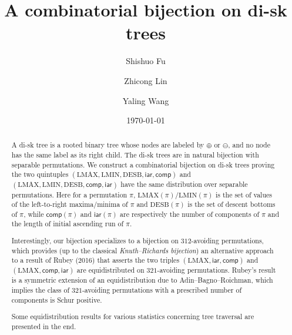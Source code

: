 \documentclass[12pt]{amsart}
\numberwithin{equation}{section}
\theoremstyle{plain}
\theoremstyle{definition}
\def\iar{\mathsf{iar}}
\def\comp{\mathsf{comp}}
\def\LMAX{\mathrm{LMAX}}
\def\LMIN{\mathrm{LMIN}}
\def\LMIN{\mathrm{LMIN}}
\def\DESB{\mathrm{DESB}}
\def\DESB{\mathrm{DESB}}
\begin{document}
\title[A combinatorial bijection on di-sk trees]{A combinatorial bijection on di-sk trees}


\author[S. Fu]{Shishuo Fu}
\address[Shishuo Fu]{College of Mathematics and Statistics, Chongqing University, Huxi campus, Chongqing 401331, P.R. China}

\author[Z. Lin]{Zhicong Lin}
\address[Zhicong Lin]{Research Center for Mathematics and Interdisciplinary Sciences, Shandong University, Qingdao 266237, P.R. China}

\author[Y. Wang]{Yaling Wang}
\address[Yaling Wang]{School of Mathematical Sciences, Dalian University of Technology, Dalian 116024, P.R. China}

\date{\today}


\begin{abstract}
A di-sk tree is a rooted binary tree whose nodes are labeled by $\oplus$ or $\ominus$, and no node has the same label as its right child. The di-sk trees are in natural bijection with separable permutations. We construct a combinatorial bijection on di-sk trees proving  the two quintuples $(\LMAX,\LMIN,\DESB,\iar,\comp)$ and $(\LMAX,\LMIN,\DESB,\comp,\iar)$ have the same distribution over separable permutations. Here for a permutation $\pi$, $\LMAX(\pi)/\LMIN(\pi)$ is the set of values of the left-to-right maxima/minima of $\pi$ and $\DESB(\pi)$ is the set of descent bottoms of $\pi$, while $\comp(\pi)$ and $\iar(\pi)$ are respectively  the number of components of $\pi$ and the length of initial ascending run of $\pi$. 

Interestingly, our bijection specializes to a bijection on $312$-avoiding permutations, which provides  (up to the classical {\em Knuth--Richards bijection}) an alternative approach to a result of Rubey (2016) that asserts the  two triples $(\LMAX,\iar,\comp)$ and $(\LMAX,\comp,\iar)$ are equidistributed  on $321$-avoiding permutations. Rubey's result is a symmetric extension of an equidistribution due to Adin--Bagno--Roichman, which implies the class of $321$-avoiding permutations with a prescribed number of components is Schur positive. 

Some equidistribution results for various statistics concerning tree traversal are presented in the end.


\end{abstract}
\end{document}
